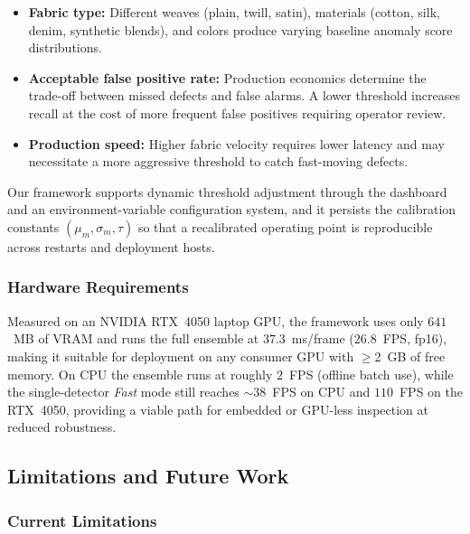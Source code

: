 \documentclass[journal]{IEEEtran}
\begin{document}
\begin{itemize}[nosep]
    \item \textbf{Fabric type:} Different weaves (plain, twill, satin), materials (cotton, silk, denim, synthetic blends), and colors produce varying baseline anomaly score distributions.
    \item \textbf{Acceptable false positive rate:} Production economics determine the trade-off between missed defects and false alarms. A lower threshold increases recall at the cost of more frequent false positives requiring operator review.
    \item \textbf{Production speed:} Higher fabric velocity requires lower latency and may necessitate a more aggressive threshold to catch fast-moving defects.
\end{itemize}

Our framework supports dynamic threshold adjustment through the dashboard and an environment-variable configuration system, and it persists the calibration constants $(\mu_m,\sigma_m,\tau)$ so that a recalibrated operating point is reproducible across restarts and deployment hosts.

\subsubsection{Hardware Requirements}

Measured on an NVIDIA RTX~4050 laptop GPU, the framework uses only $641$~MB of VRAM and runs the full ensemble at $37.3$~ms/frame ($26.8$~FPS, fp16), making it suitable for deployment on any consumer GPU with $\geq$2~GB of free memory. On CPU the ensemble runs at roughly $2$~FPS (offline batch use), while the single-detector \textit{Fast} mode still reaches $\sim$38~FPS on CPU and $110$~FPS on the RTX~4050, providing a viable path for embedded or GPU-less inspection at reduced robustness.

\subsection{Limitations and Future Work}

\subsubsection{Current Limitations}
\end{document}
